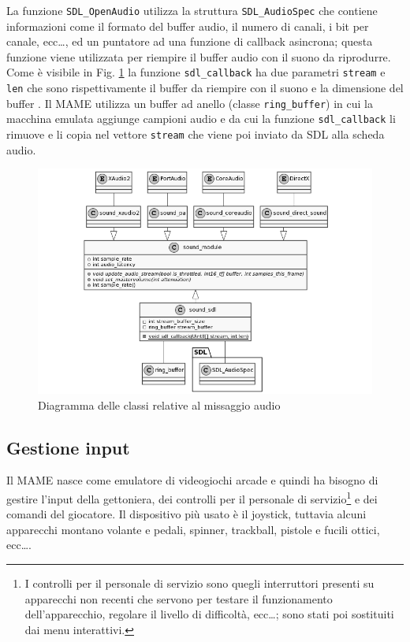 La funzione \verb|SDL_OpenAudio| utilizza la struttura \verb|SDL_AudioSpec| che contiene informazioni come il formato del buffer audio, il numero di canali, i bit per canale, ecc\dots, ed un puntatore ad una funzione di callback asincrona; questa funzione viene utilizzata per riempire il buffer audio con il suono da riprodurre. Come è visibile in Fig. \ref{fig:class_mixingSDLFull} la funzione \verb|sdl_callback| ha due parametri \verb|stream| e \verb|len| che sono rispettivamente il buffer da riempire con il suono e la dimensione del buffer \parencite{FocusOnSDL}. Il MAME utilizza un buffer ad anello (classe \verb|ring_buffer|) in cui la macchina emulata aggiunge campioni audio e da cui la funzione \verb|sdl_callback| li rimuove e li copia nel vettore \verb|stream| che viene poi inviato da SDL alla scheda audio.

\begin{figure}[H]
	\includegraphics[width=\linewidth]{immagini/class_mixingSDLFull}
	\caption{Diagramma delle classi relative al missaggio audio}
	\label{fig:class_mixingSDLFull}
\end{figure}



\subsection{Gestione input} \label{subsec:cap2_GestioneInput}
Il MAME nasce come emulatore di videogiochi arcade e quindi ha bisogno di gestire l'input della gettoniera, dei controlli per il personale di servizio\footnote{I controlli per il personale di servizio sono quegli interruttori presenti su apparecchi non recenti che servono per testare il funzionamento dell'apparecchio, regolare il livello di difficoltà, ecc\dots; sono stati poi sostituiti dai menu interattivi.} e dei comandi del giocatore. Il dispositivo più usato è il joystick, tuttavia alcuni apparecchi montano volante e pedali, spinner, trackball, pistole e fucili ottici, ecc\dots \parencite{Il_progetto_MAME}.

